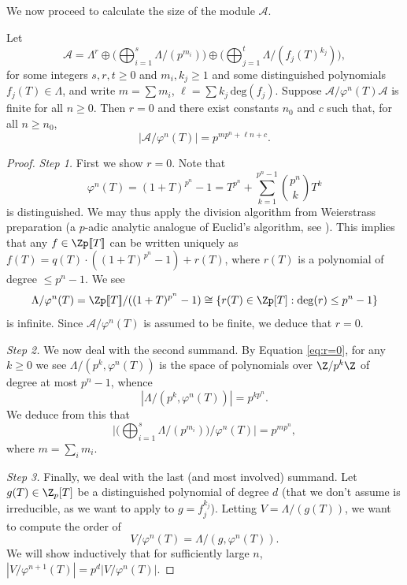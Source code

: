 \documentclass[a4paper,10pt, english, reqno]{smfart}
\newcommand{\lsem}{[\! [}
\newcommand{\rsem}{]\! ]}
\numberwithin{equation}{section}
\begin{document}
We now proceed to calculate the size of the module $\mathscr{A}$.

\begin{proposition} \label{prop:size of A}
Let
\[ \mathscr{A} = \Lambda^r \oplus \bigg( \bigoplus_{i = 1}^s \Lambda / (p^{m_i}) \bigg) \oplus \bigg( \bigoplus_{j = 1}^t \Lambda / (f_j(T)^{k_j}) \bigg), \]
for some integers $s, r, t \geq 0$ and $m_i, k_j \geq 1$ and some distinguished polynomials $f_j(T) \in \Lambda$, and write $m = \sum m_i$, $\ell = \sum k_j \, \mathrm{deg}(f_j)$. Suppose $\mathscr{A} / \varphi^n(T) \mathscr{A}$ is finite for all $n \geq 0$. Then $r = 0$ and there exist constants $n_0$ and $c$ such that, for all $n \geq n_0$, 
\[ | \mathscr{A} / \varphi^n(T)| = p^{m p^n + \ell n + c}.\]
\end{proposition}

\begin{proof}

\textit{Step 1.} First we show $r = 0$. Note that
\[
    \varphi^n(T) = (1+T)^{p^n}-1 = T^{p^n} + \sum_{k = 1}^{p^n - 1} {p^n \choose k} T^k
\]
is distinguished. We may thus apply the division algorithm from Weierstrass preparation (a $p$-adic analytic analogue of Euclid's algorithm, see \cite[\S5.2.1]{BGR}). This implies that any $f \in \Zp\lsem T\rsem$ can be written uniquely as $f(T) = q(T)\cdot ((1+T)^{p^n}-1) + r(T)$, where $r(T)$ is a polynomial of degree $\leq p^n-1$. We see 
\begin{equation}\label{eq:r=0}
    \Lambda/\varphi^n(T) = \Zp[\![T]\!]/((1+T)^{p^n}-1) \cong \{r(T) \in \Zp[T] : \mathrm{deg}(r) \leq p^n-1\}
\end{equation}
is infinite. Since $\mathscr{A} / \varphi^n(T)$ is assumed to be finite, we deduce that $r = 0$.

\medskip

\textit{Step 2.} We now deal with the second summand. By Equation \eqref{eq:r=0}, for any $k \geq 0$ we see $\Lambda/(p^k,\varphi^n(T))$ is the space of polynomials over $\Z/p^k\Z$ of degree at most $p^n-1$, whence
\[ | \Lambda / (p^k,\varphi^n(T)) |= p^{k p^n}. \]  
We deduce from this that
\[ \bigg|  \bigg(\bigoplus_{i = 1}^s \Lambda / (p^{m_i})\bigg)\Big/\varphi^n(T) \bigg| = p^{m p^n}, \] where $m = \sum_{i} m_i$.

\medskip

\textit{Step 3.} Finally, we deal with the last (and most involved) summand. Let $g(T) \in \Z_p[T]$ be a distinguished polynomial of degree $d$ (that we don't assume is irreducible, as we want to apply to $g=  f_j^{k_j}$). Letting $V = \Lambda / (g(T))$, we want to compute the order of 
\[
    V/\varphi^n(T) = \Lambda/(g,\varphi^n(T)).
\]
We will show inductively that for sufficiently large $n$, $|V/\varphi^{n+1}(T)| = p^{d}|V/\varphi^{n}(T)|$.


\end{proof}
\end{document}
